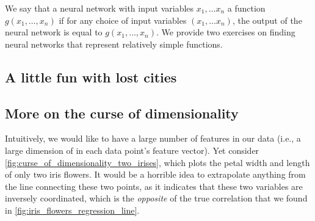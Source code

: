 We say that a neural network with input variables $x_1, \ldots x_n$  a function $g(x_1, \ldots, x_n)$ if for any choice of input variables $(x_1, \ldots x_n)$, the output of the neural network is equal to $g(x_1, \ldots, x_n)$.  We provide two exercises on finding neural networks that represent relatively simple functions.\\

\begin{exercise}\end{exercise}

\begin{exercise}[%
Consider the function $g(x_1, x_2)$ for binary input variables $x_1$ and $x_2$ that outputs 1 when $x_1 \neq x_2$ and 0 when $x_1 = x_2$. (The function \textvar{g} is known as an ``\texttt{XOR} gate'').  It can be shown that no single perceptron represents \textvar{g}; find a neural network of perceptrons that represents \textvar{g}.
]\end{exercise}

\subsection{A little fun with lost cities}

\begin{exercise}[%
Consider the three points $x = (-8, 1)$, $y = (7, 6)$, and $z = (10, -2)$. Say that the distances from these points to some point \textvar{w} with unknown location are as follows: $d(x, w) = 13$; $d(y, w) = 3$; $d(z, w) = 10$. Where is \textvar{w}?
]\end{exercise}

\subsection{More on the curse of dimensionality}

Intuitively, we would like to have a large number of features in our data (i.e., a large dimension of  in each data point's feature vector). Yet consider \autoref{fig:curse_of_dimensionality_two_irises}, which plots the petal width and length of only two iris flowers. It would be a horrible idea to extrapolate anything from the line connecting these two points, as it indicates that these two variables are inversely coordinated, which is the \textit{opposite} of the true correlation that we found in \autoref{fig:iris_flowers_regression_line}.

